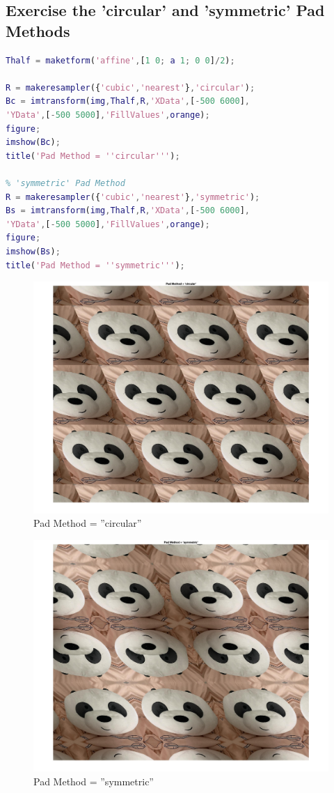 \documentclass[conference]{IEEEtran}
\begin{document}
\subsection{Exercise the 'circular' and 'symmetric' Pad Methods}
\begin{lstlisting}[language=Matlab]
% 'circular' Pad Method
Thalf = maketform('affine',[1 0; a 1; 0 0]/2);

R = makeresampler({'cubic','nearest'},'circular');
Bc = imtransform(img,Thalf,R,'XData',[-500 6000],
'YData',[-500 5000],'FillValues',orange);
figure;
imshow(Bc);
title('Pad Method = ''circular''');

% 'symmetric' Pad Method
R = makeresampler({'cubic','nearest'},'symmetric');
Bs = imtransform(img,Thalf,R,'XData',[-500 6000],
'YData',[-500 5000],'FillValues',orange);
figure;
imshow(Bs);
title('Pad Method = ''symmetric''');
\end{lstlisting}

\begin{figure}[h!]
\centering
\includegraphics[width=0.8\linewidth]{images/img36.jpg}
\caption{Pad Method = ''circular''}
\label{fig:circular}
\end{figure}

\begin{figure}[h!]
\centering
\includegraphics[width=0.8\linewidth]{images/img37.jpg}
\caption{Pad Method = ''symmetric''}
\label{fig:symmetric}
\end{figure}
\end{document}
